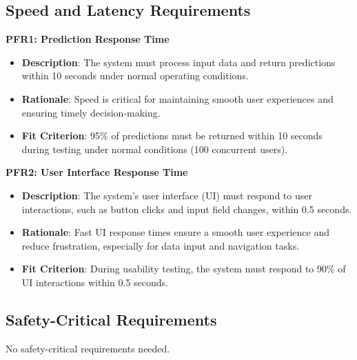 \documentclass[12pt]{article}
\begin{document}
\subsection{Speed and Latency Requirements}
\textbf{PFR1: Prediction Response Time}
\begin{itemize}
    \item \textbf{Description}: The system must process input data and return
    predictions within 10 seconds under normal operating conditions.
    \item \textbf{Rationale}: Speed is critical for maintaining smooth user
    experiences and ensuring timely decision-making.
    \item \textbf{Fit Criterion}: 95\% of predictions must be returned within 10
    seconds during testing under normal conditions (100 concurrent users).
\end{itemize}
\textbf{PFR2: User Interface Response Time}
\begin{itemize}
    \item \textbf{Description}: The system's user interface (UI) must respond to
    user interactions, such as button clicks and input field changes, within 0.5
    seconds.
    \item \textbf{Rationale}: Fast UI response times ensure a smooth user
    experience and reduce frustration, especially for data input and navigation
    tasks.
    \item \textbf{Fit Criterion}: During usability testing, the system must
    respond to 90\% of UI interactions within 0.5 seconds.
\end{itemize}

\subsection{Safety-Critical Requirements}
No safety-critical requirements needed.
\end{document}
